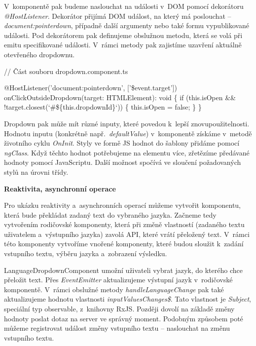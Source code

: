 V~komponentě pak budeme naslouchat na události v~DOM pomocí dekorátoru \emph{@HostListener}. 
Dekorátor přijímá DOM událost, na který má poslouchat -- \emph{document:pointerdown}, případně další argumenty nebo také formu vypublikované události. 
Pod dekorátorem pak definujeme obslužnou metodu, která se volá při emitu specifikované události. V~rámci metody pak zajistíme uzavření aktuálně otevřeného dropdownu.

\begin{prog}
// Část souboru dropdown.component.ts

@HostListener('document:pointerdown', ['\$event.target'])
onClickOutsideDropdown(target: HTMLElement): void \{
  if (this.isOpen && !target.closest(`#\$\{this.dropdownId\}`)) \{
    this.isOpen = false;
  \}
\}
\end{prog}

Dropdown pak může mít různé inputy, které povedou k~lepší znovupoužitelnosti. Hodnotu inputu (konkrétně např.~\emph{defaultValue}) v~komponentě získáme v~metodě životního cyklu \emph{OnInit}. 
Styly ve formě JS hodnot do šablony přidáme pomocí \emph{ngClass}. Když těchto hodnot potřebujeme na elementu více, zřetězíme předávané hodnoty pomocí JavaScriptu. 
Další možnost spočívá ve sloučení požadovaných stylů na úrovni třídy.

\begin{flushleft}
  \textbf{Reaktivita, asynchronní operace}
\end{flushleft}

Pro ukázku reaktivity a~asynchronních operací můžeme vytvořit komponentu, která bude překládat zadaný text do vybraného jazyka. 
Začneme tedy vytvořením rodičovské komponenty, která při změně vlastností (zadaného textu uživatelem a~výstupního jazyka) zavolá API, které vrátí přeložený text. 
V~rámci této komponenty vytvoříme vnořené komponenty, které budou sloužit k~zadání vstupního textu, výběru jazyka a~zobrazení výsledku. 

LanguageDropdownComponent umožní uživateli vybrat jazyk, do kterého chce přeložit text. 
Přes \emph{EventEmitter} aktualizujeme výstupní jazyk v~rodičovské komponentě. V~rámci obslužné metody \emph{handleLanguageChange} pak také aktualizujeme hodnotu vlastnosti \emph{inputValuesChanges\$}.
Tato vlastnost je \emph{Subject}, speciální typ observable, z~knihovny RxJS. Později dovolí na základě změny hodnoty poslat dotaz na server ve správný moment. 
Podobným způsobem poté můžeme registrovat událost změny vstupního textu -- naslouchat na změnu vstupního textu.

